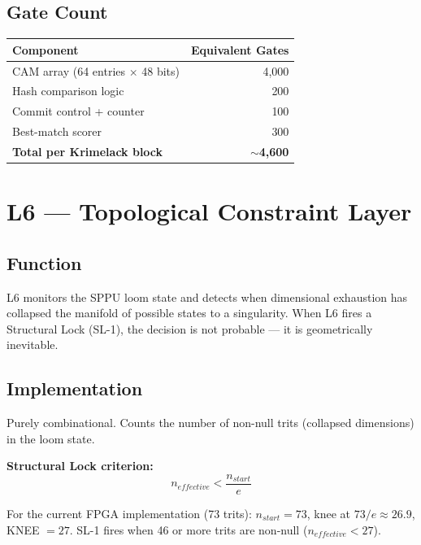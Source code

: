 \documentclass[11pt, a4paper]{article}
\begin{document}
\subsection{Gate Count}

\begin{center}
\begin{tabular}{@{}lr@{}}
\toprule
\textbf{Component} & \textbf{Equivalent Gates} \\
\midrule
CAM array (64 entries $\times$ 48 bits) & 4,000 \\
Hash comparison logic & 200 \\
Commit control + counter & 100 \\
Best-match scorer & 300 \\
\midrule
\textbf{Total per Krimelack block} & \textbf{$\sim$4,600} \\
\bottomrule
\end{tabular}
\end{center}

\section{L6 — Topological Constraint Layer}

\subsection{Function}

L6 monitors the SPPU loom state and detects when dimensional
exhaustion has collapsed the manifold of possible states to a
singularity. When L6 fires a Structural Lock (SL-1), the decision
is not probable — it is geometrically inevitable.

\subsection{Implementation}

Purely combinational. Counts the number of non-null trits
(collapsed dimensions) in the loom state.

\textbf{Structural Lock criterion:}
\begin{equation}
  n_{effective} < \frac{n_{start}}{e}
\end{equation}

For the current FPGA implementation (73 trits): $n_{start} = 73$,
knee at $73/e \approx 26.9$, KNEE $= 27$.
SL-1 fires when 46 or more trits are non-null ($n_{effective} < 27$).
\end{document}
